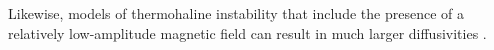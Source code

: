 %
Likewise, models of thermohaline instability that include the presence of a relatively low-amplitude magnetic field can result in much larger diffusivities \citep{harrington}. %


%

